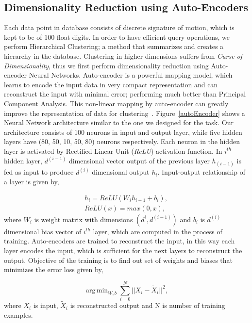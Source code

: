 \documentclass[twocolumn,10pt]{asme2ej}
\DeclareMathOperator*{\argminA}{arg\,min}
\begin{document}
\subsection{Dimensionality Reduction using Auto-Encoders}
Each data point in database consists of discrete signature of motion, which is kept to be of 100 float digits.
In order to have efficient query operations, we perform Hierarchical Clustering; a method that summarizes and creates a hierarchy in the database.
Clustering in higher dimensions suffers from \emph{Curse of Dimensionality}\cite{marimont1979}, thus we first perform dimensionality reduction using Auto-encoder Neural Networks.
Auto-encoder is a powerful mapping model, which learns to encode the input data in very compact representation and can reconstruct the input with minimal error; performing much better than Principal Component Analysis\cite{hinton2006}.
This non-linear mapping by auto-encoder can greatly improve the representation of data for clustering~\cite{song2013}.
Figure~\ref{autoEncoder} shows a Neural Network architecture similar to the one we designed for the task.
Our architecture consists of 100 neurons in input and output layer, while five hidden layers have (80, 50, 10, 50, 80) neurons respectively.
Each neuron in the hidden layer is activated by Rectified Linear Unit (\emph{ReLU}) activation function.
In $i^{th}$ hidden layer, $d^{(i-1)}$ dimensional vector output of the previous layer $h_(i-1)$ is fed as input to produce $d^{(i)}$ dimensional output $h_i$.
Input-output relationship of a layer is given by,

\begin{eqnarray}\label{nnlayer}
  h_i = ReLU(W_{i}h_{i-1} + b_{i}), \\
  ReLU(x) = max(0, x),
\end{eqnarray}
where $W_i$ is weight matrix with dimensions $(d^{i}, d^{(i-1)})$ and $b_i$ is $d^{(i)}$ dimensional bias vector of $i^{th}$ layer, which are computed in the process of training.
Auto-encoders are trained to reconstruct the input, in this way each layer encodes the input, which is sufficient for the next layers to reconstruct the output.
Objective of the training is to find out set of weights and biases that minimizes the error loss given by,

\begin{equation}\label{nnloss}
  \argminA_{W, b} \sum_{i=0}^{N} || X_i - \tilde{X}_i ||^2,
\end{equation}
where $X_i$ is input, $\tilde{X}_i$ is reconstructed output and N is number of training examples.
\end{document}
